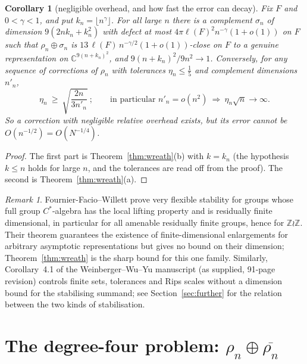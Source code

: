 \documentclass[11pt]{amsart}
\newtheorem{corollary}[theorem]{Corollary}
\theoremstyle{definition}
\theoremstyle{remark}
\newtheorem{remark}[theorem]{Remark}
\newcommand{\Z}{\mathbb Z}
\newcommand{\C}{\mathbb C}
\begin{document}
\begin{corollary}[negligible overhead, and how fast the error can decay]\label{cor:negligible}
Fix $F$ and $0<\gamma<1$, and put $k_n=\lfloor n^\gamma\rfloor$. For all large $n$ there is a complement $\sigma_n$ of dimension $9(2nk_n+k_n^2)$ with defect at most $4\pi\ell(F)^2n^{-\gamma}(1+o(1))$ on $F$ such that $\rho_n\oplus\sigma_n$ is $13\,\ell(F)\,n^{-\gamma/2}(1+o(1))$-close on $F$ to a genuine representation on $\C^{9(n+k_n)^2}$, and $9(n+k_n)^2/9n^2\to1$. Conversely, for any sequence of corrections of $\rho_n$ with tolerances $\eta_n\le\frac15$ and complement dimensions $n'_n$,
\[
\eta_n\ \ge\ \sqrt{\frac{2n}{3n'_n}}\ ;\qquad\text{in particular } n'_n=o(n^2)\ \Longrightarrow\ \eta_n\sqrt n\to\infty .
\]
So a correction with negligible relative overhead exists, but its error cannot be $O(n^{-1/2})=O(N^{-1/4})$.
\end{corollary}

\begin{proof}
The first part is Theorem~\ref{thm:wreath}(b) with $k=k_n$ (the hypothesis $k\le n$ holds for large $n$, and the tolerances are read off from the proof). The second is Theorem~\ref{thm:wreath}(a).
\end{proof}

\begin{remark}
Fournier-Facio--Willett \cite{FW26} prove very flexible stability for groups whose full group $C^*$-algebra has the local lifting property and is residually finite dimensional, in particular for all amenable residually finite groups, hence for $\Z\wr\Z$. Their theorem guarantees the existence of finite-dimensional enlargements for arbitrary asymptotic representations but gives no bound on their dimension; Theorem~\ref{thm:wreath} is the sharp bound for this one family. Similarly, Corollary~4.1 of the Weinberger--Wu--Yu manuscript (as supplied, 91-page revision) controls finite sets, tolerances and Rips scales without a dimension bound for the stabilising summand; see Section~\ref{sec:further} for the relation between the two kinds of stabilisation.
\end{remark}

\section{The degree-four problem: $\rho_n\oplus\overline{\rho_n}$}\label{sec:deg4}
\end{document}
